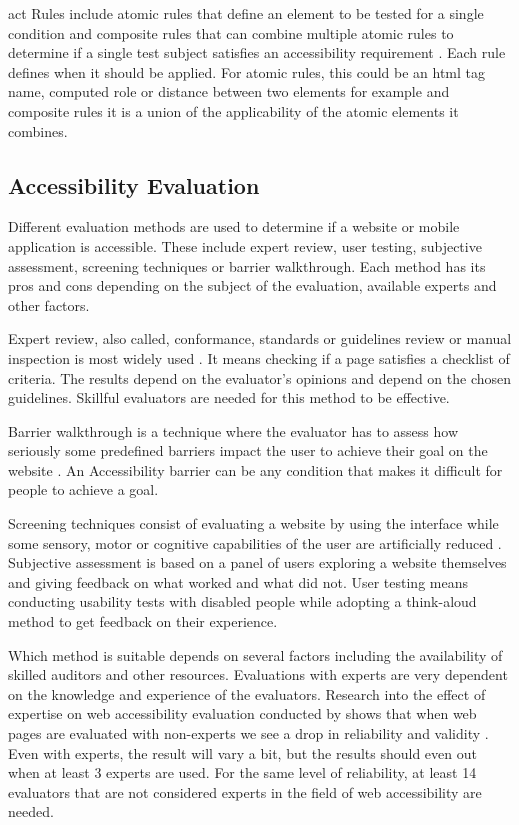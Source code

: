 \documentclass{master_thesis}
\begin{document}
\ac{act} Rules include atomic rules that define an element to be tested for a single condition and composite rules that can combine multiple atomic rules to determine if a single test subject satisfies an accessibility requirement \citep{Fiers2019}. Each rule defines when it should be applied. For atomic rules, this could be an \ac{html} tag name, computed role or distance between two elements for example and composite rules it is a union of the applicability of the atomic elements it combines.

\subsection{Accessibility Evaluation}

Different evaluation methods are used to determine if a website or mobile application is accessible. These include expert review, user testing, subjective assessment, screening techniques or barrier walkthrough. Each method has its pros and cons depending on the subject of the evaluation, available experts and other factors.

Expert review, also called, conformance, standards or guidelines review or manual inspection is most widely used \citep{Brajnik2008}. It means checking if a page satisfies a checklist of criteria. The results depend on the evaluator's opinions and depend on the chosen guidelines. Skillful evaluators are needed for this method to be effective.

Barrier walkthrough is a technique where the evaluator has to assess how seriously some predefined barriers impact the user to achieve their goal on the website \citep{Brajnik2008}. An Accessibility barrier can be any condition that makes it difficult for people to achieve a goal.

Screening techniques consist of evaluating a website by using the interface while some sensory, motor or cognitive capabilities of the user are artificially reduced \citep{Brajnik2008}. Subjective assessment is based on a panel of users exploring a website themselves and giving feedback on what worked and what did not. User testing means conducting usability tests with disabled people while adopting a think-aloud method to get feedback on their experience.

Which method is suitable depends on several factors including the availability of skilled auditors and other resources. Evaluations with experts are very dependent on the knowledge and experience of the evaluators. Research into the effect of expertise on web accessibility evaluation conducted by \citeauthor{Brajnik2011} shows that when web pages are evaluated with non-experts we see a drop in reliability and validity \citep{Brajnik2011}. Even with experts, the result will vary a bit, but the results should even out when at least 3 experts are used. For the same level of reliability, at least 14 evaluators that are not considered experts in the field of web accessibility are needed.
\end{document}

